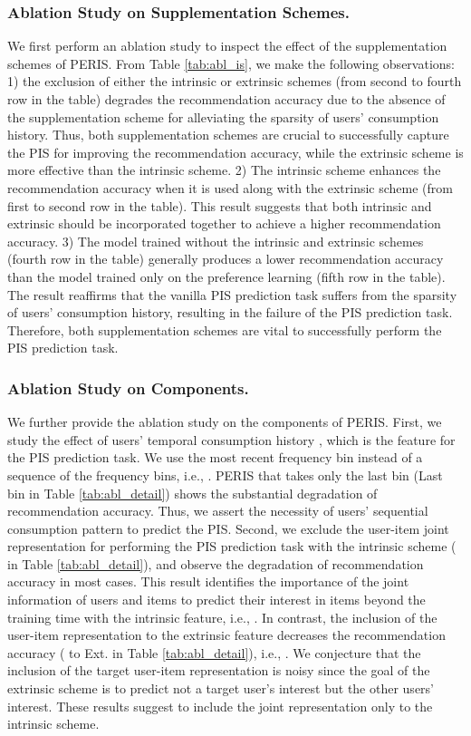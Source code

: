 \documentclass[sigconf]{acmart}
\newcommand{\MD}{{\small\textsf{PERIS}}}
\begin{document}
\subsubsection{\textbf{Ablation Study on Supplementation Schemes.}}
\label{sec:abl}
We first perform an ablation study to inspect the effect of the supplementation schemes of \MD{}.
From Table \ref{tab:abl_is}, we make the following observations: 1) the exclusion of either the intrinsic or extrinsic schemes (from second to fourth row in the table) degrades the recommendation accuracy due to the absence of the supplementation scheme for alleviating the sparsity of users' consumption history. Thus, both supplementation schemes are crucial to successfully capture the PIS for improving the recommendation accuracy, while the extrinsic scheme is more effective than the intrinsic scheme. 
2) The intrinsic scheme enhances the recommendation accuracy when it is used along with the extrinsic scheme (from first to second row in the table). This result suggests that both intrinsic and extrinsic should be incorporated together to achieve a higher recommendation accuracy. 
3) The model trained without the intrinsic and extrinsic schemes (fourth row in the table) generally produces a lower recommendation accuracy than the model trained only on the preference learning (fifth row in the table). The result reaffirms that the vanilla PIS prediction task suffers from the sparsity of users' consumption history, resulting in the failure of the PIS prediction task. Therefore, both supplementation schemes are vital to successfully perform the PIS prediction task. 

\subsubsection{\textbf{Ablation Study on Components.}}
We further provide the ablation study on the components of \MD{}. 
First, we study the effect of users' temporal consumption history , which is the feature for the PIS prediction task. We use the most recent frequency bin  instead of a sequence of the frequency bins, i.e., . 
\MD{} that takes only the last bin  (Last bin in Table \ref{tab:abl_detail}) shows the substantial degradation of recommendation accuracy.
Thus, we assert the necessity of users' sequential consumption pattern to predict the PIS. 
Second, we exclude the user-item joint representation for performing the PIS prediction task with the intrinsic scheme ( in Table \ref{tab:abl_detail}), and observe the degradation of recommendation accuracy in most cases. This result identifies the importance of the joint information of users and items to predict their interest in items beyond the training time with the intrinsic feature, i.e., . In contrast, the inclusion of the user-item representation  to the extrinsic feature  decreases the recommendation accuracy ( to Ext. in Table \ref{tab:abl_detail}), i.e., . We conjecture that the inclusion of the target user-item representation  is noisy since the goal of the extrinsic scheme is to predict not a target user's interest but the other users' interest. These results suggest to include the joint representation  only to the intrinsic scheme.
\end{document}
